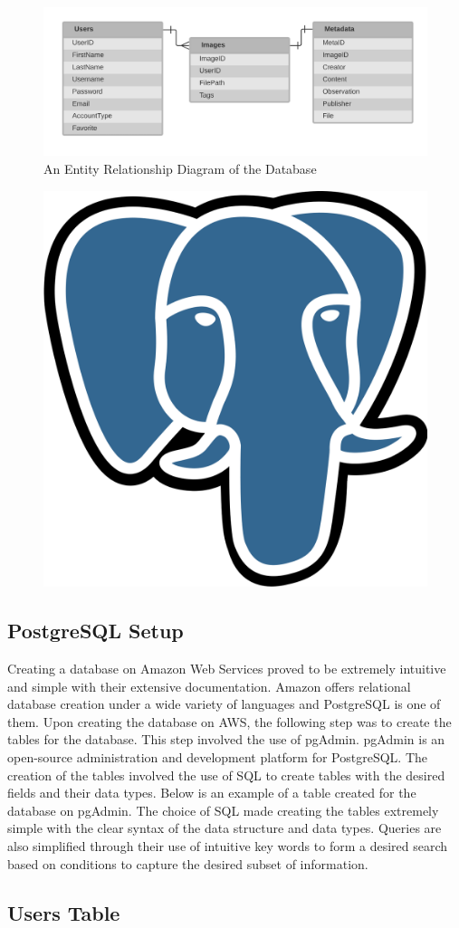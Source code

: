 \documentclass[12pt]{report}
\begin{document}
\begin{figure}[h]
	\centering
	\includegraphics[width=\linewidth]{database}
	\caption{An Entity Relationship Diagram of the Database}
	\label{fig:ERD}
\end{figure}

\begin{figure}[h]
	\centering
	\includegraphics[width=0.251\linewidth]{postgresql}
\end{figure}

\subsection*{PostgreSQL Setup}

Creating a database on Amazon Web Services proved to be extremely intuitive and simple with their extensive documentation.  Amazon offers relational database creation under a wide variety of languages and PostgreSQL is one of them.  Upon creating the database on AWS, the following step was to create the tables for the database.  This step involved the use of pgAdmin.  pgAdmin is an open-source administration and development platform for PostgreSQL.  The creation of the tables involved the use of SQL to create tables with the desired fields and their data types.  Below is an example of a table created for the database on pgAdmin.  The choice of SQL made creating the tables extremely simple with the clear syntax of the data structure and data types.  Queries are also simplified through their use of intuitive key words to form a desired search based on conditions to capture the desired subset of information.

\subsection*{Users Table}
\end{document}
